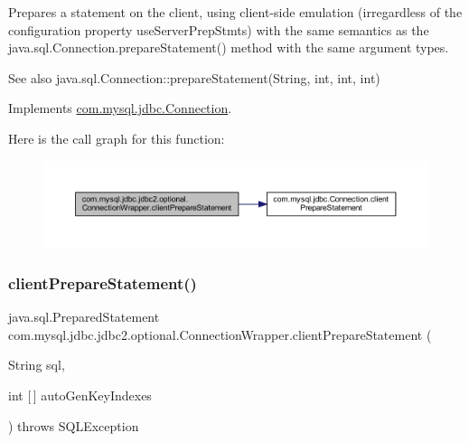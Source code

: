 Prepares a statement on the client, using client-\/side emulation (irregardless of the configuration property \textquotesingle{}use\+Server\+Prep\+Stmts\textquotesingle{}) with the same semantics as the java.\+sql.\+Connection.\+prepare\+Statement() method with the same argument types.

\begin{DoxySeeAlso}{See also}
java.\+sql.\+Connection\+::prepare\+Statement(\+String, int, int, int) 
\end{DoxySeeAlso}


Implements \mbox{\hyperlink{interfacecom_1_1mysql_1_1jdbc_1_1_connection_af2c3e5b2cd7768c4fdf7ca4e75558bbf}{com.\+mysql.\+jdbc.\+Connection}}.

Here is the call graph for this function\+:
\nopagebreak
\begin{figure}[H]
\begin{center}
\leavevmode
\includegraphics[width=350pt]{classcom_1_1mysql_1_1jdbc_1_1jdbc2_1_1optional_1_1_connection_wrapper_a546e049a9b2f6741d15e1e1bdbe31292_cgraph}
\end{center}
\end{figure}
\mbox{\label{classcom_1_1mysql_1_1jdbc_1_1jdbc2_1_1optional_1_1_connection_wrapper_a2553dc69e9e6f8026ed0bf4911a9e417}} 
\subsubsection{\texorpdfstring{client\+Prepare\+Statement()}{clientPrepareStatement()}\hspace{0.1cm}{\footnotesize\ttfamily [5/6]}}
{\footnotesize\ttfamily java.\+sql.\+Prepared\+Statement com.\+mysql.\+jdbc.\+jdbc2.\+optional.\+Connection\+Wrapper.\+client\+Prepare\+Statement (\begin{DoxyParamCaption}\item[{String}]{sql,  }\item[{int \mbox{[}$\,$\mbox{]}}]{auto\+Gen\+Key\+Indexes }\end{DoxyParamCaption}) throws S\+Q\+L\+Exception}

